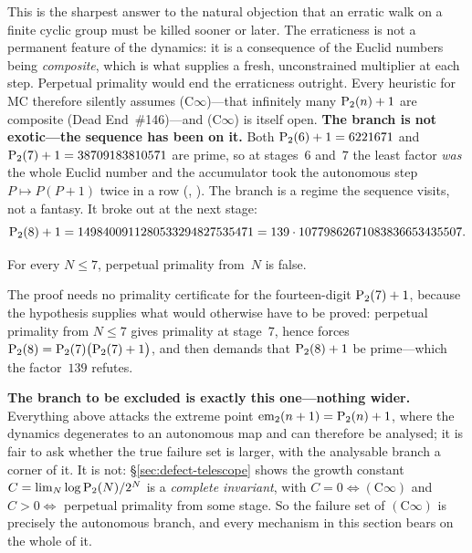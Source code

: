 This is the sharpest answer to the natural objection that an erratic
walk on a finite cyclic group must be killed sooner or later.  The
erraticness is not a permanent feature of the dynamics: it is a
consequence of the Euclid numbers being \emph{composite}, which is what
supplies a fresh, unconstrained multiplier at each step.  Perpetual
primality would end the erraticness outright.  Every heuristic for MC
therefore silently assumes (C$\infty$)---that infinitely many
$\mathrm{P}_{2}(n)+1$ are composite (Dead End~\#146)---and (C$\infty$) is
itself open.
\smallskip\noindent
\textbf{The branch is not exotic---the sequence has been on it.}  Both
$\mathrm{P}_{2}(6)+1 = 6221671$ and $\mathrm{P}_{2}(7)+1 = 38709183810571$ are prime,
so at stages~$6$ and~$7$ the least factor \emph{was} the whole Euclid
number and the accumulator took the autonomous step
$P \mapsto P(P+1)$ twice in a row
(,
).
The branch is a regime the sequence visits, not a fantasy.  It broke out
at the next stage:
\[
  \mathrm{P}_{2}(8)+1 = 1498400911280533294827535471 = 139 \cdot 10779862671083836653435507 .
\]

\begin{theorem}
\label{thm:no-perpetual-le-seven}
For every $N \leq 7$, perpetual primality from~$N$ is false.
\end{theorem}

\noindent
The proof needs no primality certificate for the fourteen-digit
$\mathrm{P}_{2}(7)+1$, because the hypothesis supplies what would otherwise
have to be proved: perpetual primality from $N \leq 7$ gives primality at
stage~$7$, hence forces $\mathrm{P}_{2}(8) = \mathrm{P}_{2}(7)\bigl(\mathrm{P}_{2}(7)+1\bigr)$,
and then demands that $\mathrm{P}_{2}(8)+1$ be prime---which the factor~$139$
refutes.

\smallskip\noindent
\textbf{The branch to be excluded is exactly this one---nothing wider.}
Everything above attacks the extreme point $\mathrm{em}_{2}(n+1) = \mathrm{P}_{2}(n)+1$,
where the dynamics degenerates to an autonomous map and can therefore be
analysed; it is fair to ask whether the true failure set is larger, with
the analysable branch a corner of it.  It is not:
\S\ref{sec:defect-telescope} shows the growth constant
$C = \lim_N \log\mathrm{P}_{2}(N)/2^N$ is a \emph{complete invariant}, with
$C = 0 \iff (\mathrm{C}\infty)$ and $C > 0 \iff$ perpetual primality from
some stage.  So the failure set of $(\mathrm{C}\infty)$ is precisely the
autonomous branch, and every mechanism in this section bears on the whole
of it.

